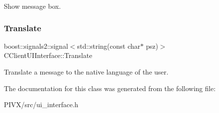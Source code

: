 Show message box. \mbox{\label{class_c_client_u_i_interface_a6e1e57cb42e3a1a0b133745a897cf8ed}} 
\subsubsection{\texorpdfstring{Translate}{Translate}}
{\footnotesize\ttfamily boost\+::signals2\+::signal$<$std\+::string(const char$\ast$ psz)$>$ C\+Client\+U\+I\+Interface\+::\+Translate}

Translate a message to the native language of the user. 

The documentation for this class was generated from the following file\+:\begin{DoxyCompactItemize}
\item 
P\+I\+V\+X/src/ui\+\_\+interface.\+h\end{DoxyCompactItemize}
